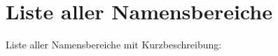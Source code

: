\section{Liste aller Namensbereiche}
Liste aller Namensbereiche mit Kurzbeschreibung\+:\begin{DoxyCompactList}
\item{}
\end{DoxyCompactList}
